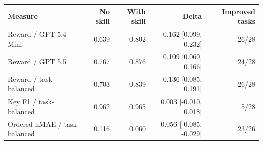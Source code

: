 \begin{tabular}{lrrrr}
\toprule
Measure & No skill & With skill & Delta & Improved tasks \\
\midrule
Reward / GPT 5.4 Mini & 0.639 & 0.802 & 0.162 [0.099, 0.232] & 26/28 \\
Reward / GPT 5.5 & 0.767 & 0.876 & 0.109 [0.060, 0.166] & 24/28 \\
Reward / task-balanced & 0.703 & 0.839 & 0.136 [0.085, 0.191] & 26/28 \\
Key F1 / task-balanced & 0.962 & 0.965 & 0.003 [-0.010, 0.018] & 5/28 \\
Ordered nMAE / task-balanced & 0.116 & 0.060 & -0.056 [-0.085, -0.029] & 23/26 \\
\bottomrule
\end{tabular}
